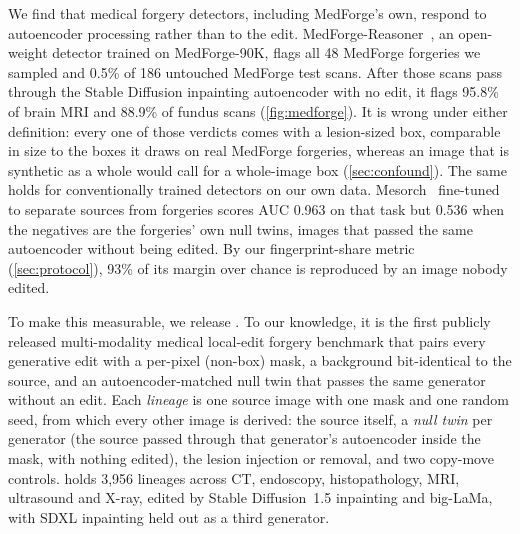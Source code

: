 We find that medical forgery detectors, including MedForge's own, respond to autoencoder processing rather than to the edit.
MedForge-Reasoner~\cite{chen2026medforge}, an open-weight detector trained on MedForge-90K, flags all 48 MedForge forgeries we sampled %
and 0.5\% of 186 untouched MedForge test scans. %
After those scans pass through the Stable Diffusion inpainting autoencoder with no edit, it flags 95.8\% of brain MRI and 88.9\% of fundus scans (\cref{fig:medforge}). %
It is wrong under either definition: every one of those verdicts comes with a lesion-sized box, comparable in size to the boxes it draws on real MedForge forgeries, whereas an image that is synthetic as a whole would call for a whole-image box (\cref{sec:confound}). %
The same holds for conventionally trained detectors on our own data.
Mesorch~\cite{zhu2025mesorch} fine-tuned to separate sources from forgeries scores AUC 0.963 on that task %
but 0.536 when the negatives are the forgeries' own null twins, %
images that passed the same autoencoder without being edited.
By our fingerprint-share metric (\cref{sec:protocol}), 93\% of its margin over chance is reproduced by an image nobody edited. %

To make this measurable, we release \dataset.
To our knowledge, it is the first publicly released multi-modality medical local-edit forgery benchmark that pairs every generative edit with a per-pixel (non-box) mask, a background bit-identical to the source, and an autoencoder-matched null twin that passes the same generator without an edit.
Each \emph{lineage} is one source image with one mask and one random seed, from which every other image is derived: the source itself, a \emph{null twin} per generator (the source passed through that generator's autoencoder inside the mask, with nothing edited), the lesion injection or removal, and two copy-move controls.
\dataset holds 3,956 lineages across CT, endoscopy, histopathology, MRI, ultrasound and X-ray, %
edited by Stable Diffusion~1.5 inpainting and big-LaMa, with SDXL inpainting held out as a third generator.

